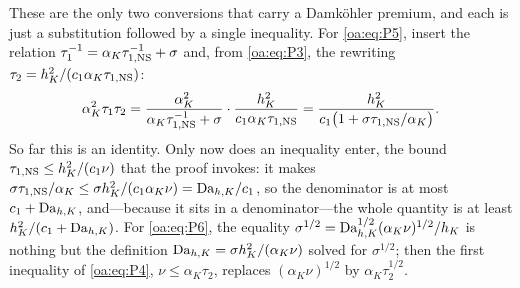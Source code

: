 \begin{pedagogy}
These are the only two conversions that carry a Damk\"ohler premium, and each is
just a substitution followed by a single inequality. For \cref{oa:eq:P5}, insert the
relation $\tau_1^{-1}=\alpha_K\tau_{1,\mathrm{NS}}^{-1}+\sigma$ and, from \cref{oa:eq:P3}, the
rewriting $\tau_2=h_K^2/(c_1\alpha_K\tau_{1,\mathrm{NS}})$:
\[
  \alpha_K^2\tau_1\tau_2
  = \frac{\alpha_K^2}{\alpha_K\tau_{1,\mathrm{NS}}^{-1}+\sigma}\cdot\frac{h_K^2}{c_1\alpha_K\tau_{1,\mathrm{NS}}}
  = \frac{h_K^2}{c_1\bigl(1+\sigma\tau_{1,\mathrm{NS}}/\alpha_K\bigr)}.
\]
So far this is an identity. Only now does an inequality enter, the bound
$\tau_{1,\mathrm{NS}}\le h_K^2/(c_1\nu)$ that the proof invokes: it makes
$\sigma\tau_{1,\mathrm{NS}}/\alpha_K\le\sigma h_K^2/(c_1\alpha_K\nu)=\mathrm{Da}_{h,K}/c_1$, so the denominator
is at most $c_1+\mathrm{Da}_{h,K}$, and---because it sits in a denominator---the whole quantity
is at least $h_K^2/(c_1+\mathrm{Da}_{h,K})$. For \cref{oa:eq:P6}, the equality
$\sigma^{1/2}=\mathrm{Da}_{h,K}^{1/2}(\alpha_K\nu)^{1/2}/h_K$ is nothing but the definition
$\mathrm{Da}_{h,K}=\sigma h_K^2/(\alpha_K\nu)$ solved for $\sigma^{1/2}$; then the first
inequality of \cref{oa:eq:P4}, $\nu\le\alpha_K\tau_2$, replaces $(\alpha_K\nu)^{1/2}$
by $\alpha_K\tau_2^{1/2}$.
\end{pedagogy}

